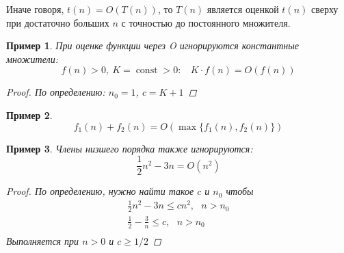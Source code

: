 \documentclass[12pt,a4paper]{report}
\def\const{\mathop{\mathrm{const}}\nolimits}
\newtheorem*{example}{Пример}
\begin{document}
Иначе говоря, $t(n)=O(T(n))$, то $T(n)$ является оценкой $t(n)$ сверху при достаточно больших $n$ с точностью до постоянного множителя.



\begin{example}
При оценке функции через O игнорируются константные множители:
$$
f(n) > 0,~ K=\const>0: ~~~~ K \cdot f(n) = O(f(n))
$$
\begin{proof}По определению: $n_0=1$, $c=K+1$\end{proof}
\end{example}


\begin{example}
$$
f_1(n) + f_2(n) = O(\max\{f_1(n), f_2(n)\})
$$
\end{example}


\begin{example}
Члены низшего порядка также игнорируются:
$$
\frac{1}{2}n^2 - 3n = O(n^2)
$$
\begin{proof}По определению, нужно найти такое $c$ и $n_0$ чтобы
$$
\begin{gathered}
\frac{1}{2}n^2 - 3n \leqslant c n^2,~~~ n>n_0\\
\frac{1}{2} - \frac{3}{n} \leqslant c,~~~ n>n_0\\
\end{gathered}
$$
Выполняется при $n>0$ и $c \geqslant 1/2$
\end{proof}
\end{example}

\end{document}
